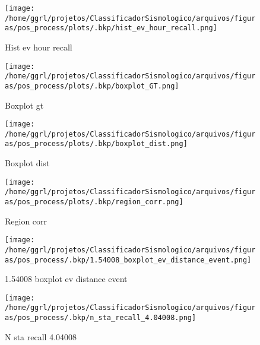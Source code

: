                     \begin{figure}[H]
                        \centering
                        \texttt{[image: /home/ggrl/projetos/ClassificadorSismologico/arquivos/figuras/pos\_process/plots/.bkp/hist\_ev\_hour\_recall.png]}
                        \caption{Hist ev hour recall}
                        \label{fig:hist_ev_hour_recall}
                    \end{figure}
                

                    \begin{figure}[H]
                        \centering
                        \texttt{[image: /home/ggrl/projetos/ClassificadorSismologico/arquivos/figuras/pos\_process/plots/.bkp/boxplot\_GT.png]}
                        \caption{Boxplot gt}
                        \label{fig:boxplot_GT}
                    \end{figure}
                

                    \begin{figure}[H]
                        \centering
                        \texttt{[image: /home/ggrl/projetos/ClassificadorSismologico/arquivos/figuras/pos\_process/plots/.bkp/boxplot\_dist.png]}
                        \caption{Boxplot dist}
                        \label{fig:boxplot_dist}
                    \end{figure}
                

                    \begin{figure}[H]
                        \centering
                        \texttt{[image: /home/ggrl/projetos/ClassificadorSismologico/arquivos/figuras/pos\_process/plots/.bkp/region\_corr.png]}
                        \caption{Region corr}
                        \label{fig:region_corr}
                    \end{figure}
                

                    \begin{figure}[H]
                        \centering
                        \texttt{[image: /home/ggrl/projetos/ClassificadorSismologico/arquivos/figuras/pos\_process/.bkp/1.54008\_boxplot\_ev\_distance\_event.png]}
                        \caption{1.54008 boxplot ev distance event}
                        \label{fig:1.54008_boxplot_ev_distance_event}
                    \end{figure}
                

                    \begin{figure}[H]
                        \centering
                        \texttt{[image: /home/ggrl/projetos/ClassificadorSismologico/arquivos/figuras/pos\_process/.bkp/n\_sta\_recall\_4.04008.png]}
                        \caption{N sta recall 4.04008}
                        \label{fig:n_sta_recall_4.04008}
                    \end{figure}
                

